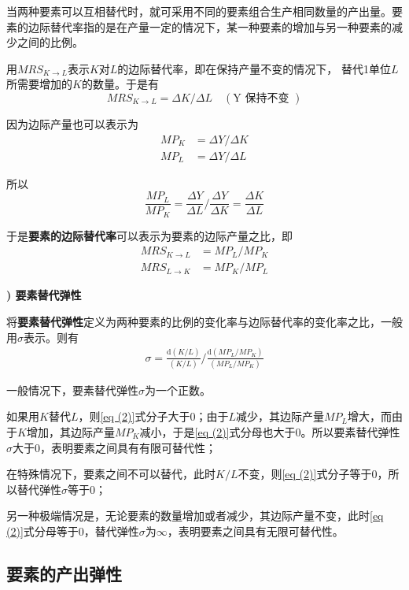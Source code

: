 当两种要素可以互相替代时，就可采用不同的要素组合生产相同数量的产出量。要素的边际替代率指的是在产量一定的情况下，某一种要素的增加与另一种要素的减少之间的比例。
			
	用$ MRS_{K \rightarrow L} $表示$ K $对$ L $的边际替代率，即在保持产量不变的情况下，
	替代1单位$ L $所需要增加的$ K $的数量。于是有
	$$ MRS_{K \rightarrow L}=\Delta K / \Delta L \quad(\mathrm{Y} \text { 保持不变 }) $$

	因为边际产量也可以表示为
	\begin{align*}
		MP_{K} & = \Delta Y / \Delta K \\
		MP_{L} & = \Delta Y / \Delta L
	\end{align*}

	所以
	$$ \frac{M P_{L}}{M P_{K}}=\frac{\Delta Y}{\Delta L} \bigg/ \frac{\Delta Y}{\Delta K}=\frac{\Delta K}{\Delta L} $$

	于是\textbf{要素的边际替代率}可以表示为要素的边际产量之比，即
	\begin{align*}
		MRS_{K \rightarrow L} & = M P_{L} / M P_{K} \\
		MRS_{L \rightarrow K} & = M P_{K} / M P_{L}
	\end{align*}
	
{\bf {}) 要素替代弹性}
			
	将\textbf{要素替代弹性}定义为两种要素的比例的变化率与边际替代率的变化率之比，一般用$ \sigma $表示。则有
	\begin{align}
		\sigma = \frac{\mathrm{d}(K / L)}{(K / L)} \bigg/ \frac{\mathrm{d}\left(M P_{L} / M P_{K}\right)}{\left(M P_{L} / M P_{K}\right)} \label{eq (2)}
	\end{align}
			
	一般情况下，要素替代弹性$ \sigma $为一个正数。
				
	如果用$ K $替代$ L $，则\eqref{eq (2)}式分子大于0；由于$ L $减少，其边际产量$ MP_{L} $增大，而由于$ K $增加，其边际产量$ MP_{K} $减小，于是\eqref{eq (2)}式分母也大于0。所以要素替代弹性$ \sigma $大于0，表明要素之间具有有限可替代性；
				
	在特殊情况下，要素之间不可以替代，此时$ K/L $不变，则\eqref{eq (2)}式分子等于0，所以替代弹性$ \sigma $等于0；
				
	另一种极端情况是，无论要素的数量增加或者减少，其边际产量不变，此时\eqref{eq (2)}式分母等于0，替代弹性$ \sigma $为$ \infty $，表明要素之间具有无限可替代性。		

\subsection{要素的产出弹性}
		
